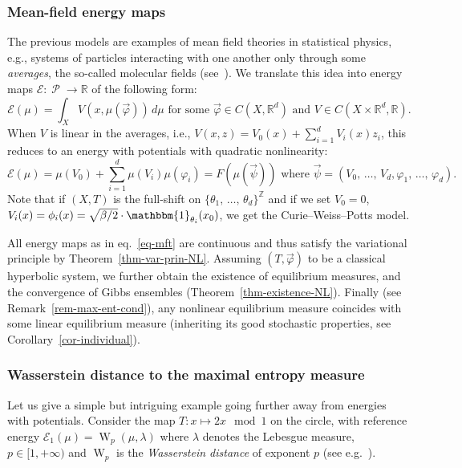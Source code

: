 \documentclass[AHL, Unicode, longabstracts,published]{cedram}
\theoremstyle{plain}
\theoremstyle{plain}
\newcommand{\wass}{\operatorname{W}}
\newcommand\Prob{{\operatorname{\mathscr{P}}}}
\newcommand{\pot}{\varphi}
\newcommand*\8{\infty}
\newcommand\RR{\mathbb{R}}
\newcommand\ZZ{\mathbb{Z}}
\newcommand{\En}{\mathcal{E}}
\begin{document}
\subsubsection{Mean-field energy maps}\label{subsubsec-mft}
The previous models are examples of mean field theories in statistical physics, e.g., systems of particles interacting with one another only through some \emph{averages}, the so-called molecular fields (see~\cite[Sections~10.5, 10.7]{Reif}). We translate this idea into energy maps $\En:\Prob\to\RR$ of the following form:
\begin{equation}\label{eq-mft}
\En(\mu) = \int_X V(x,\mu(\vec\pot))\, d\mu \text{ for some }\vec\pot\in C(X,\RR^d)\text{ and }V\in C(X\times\RR^d,\RR).
\end{equation}
When $V$ is linear in the averages, i.e., $V(x, z)=V_0(x)+\sum_{i=1}^d V_i(x)z_i$, this reduces to an energy with potentials with quadratic nonlinearity:
\[
\En(\mu)=\mu(V_0)+\sum_{i=1}^d \mu(V_i)\mu(\pot_i)=F(\mu(\vec\psi))
\text{ where }\vec\psi=(V_0,\,\dots,\,V_d,\pot_1,\,\dots,\,\pot_d).
\]
Note that if $(X,T)$ is the full-shift on $\{\theta_1,\,\dots,\,\theta_d\}^\ZZ$ and if we set $V_0=0$, $V_i(x)=\phi_i(x)=\sqrt{\beta/2}\cdot \mathbbm{1}_{\theta_i}(x_0)$, we get the Curie--Weiss--Potts model.

All energy maps as in eq.~\eqref{eq-mft} are continuous and thus satisfy the variational principle by Theorem~\ref{thm-var-prin-NL}. Assuming $(T,\vec\pot)$ to be a classical hyperbolic system, we further obtain the existence of equilibrium measures, and the convergence of Gibbs ensembles (Theorem~\ref{thm-existence-NL}). Finally (see Remark~\ref{rem-max-ent-cond}), any nonlinear equilibrium measure coincides with some linear equilibrium measure (inheriting its good stochastic properties, see Corollary~\ref{cor-individual}).


\subsubsection{Wasserstein distance to the maximal entropy measure}\label{sec-Wasserstein}

Let us give a simple but intriguing example going further away from energies with potentials. Consider the map $T:x\mapsto 2 x \mod 1 $ on the circle, with reference energy $\En_{1}(\mu)=\wass_p(\mu,\lambda)$ where $\lambda$ denotes the Lebesgue measure, $p\in[1,+\infty)$ and $\wass_p$ is the \emph{Wasserstein distance} of exponent $p$ (see e.g.~\cite{Villani-book}).
\end{document}

